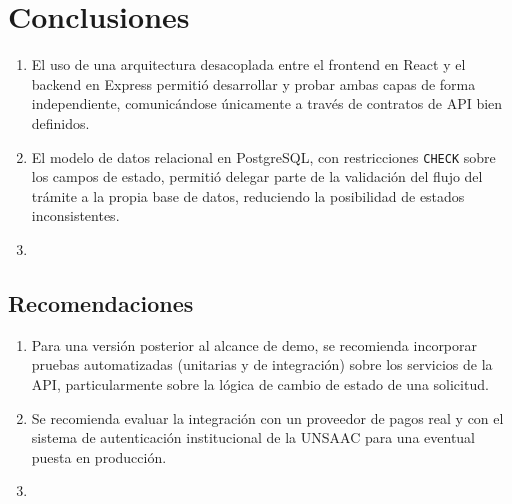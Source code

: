 \section{Conclusiones}

\begin{enumerate}
    \item El uso de una arquitectura desacoplada entre el frontend en React
    y el backend en Express permitió desarrollar y probar ambas capas de
    forma independiente, comunicándose únicamente a través de contratos de
    API bien definidos.
    \item El modelo de datos relacional en PostgreSQL, con restricciones
    \texttt{CHECK} sobre los campos de estado, permitió delegar parte de la
    validación del flujo del trámite a la propia base de datos, reduciendo
    la posibilidad de estados inconsistentes.
    \item[] %
\end{enumerate}

\subsection{Recomendaciones}
\begin{enumerate}
    \item Para una versión posterior al alcance de demo, se recomienda
    incorporar pruebas automatizadas (unitarias y de integración) sobre los
    servicios de la API, particularmente sobre la lógica de cambio de
    estado de una solicitud.
    \item Se recomienda evaluar la integración con un proveedor de pagos
    real y con el sistema de autenticación institucional de la UNSAAC para
    una eventual puesta en producción.
    \item[] %
\end{enumerate}
